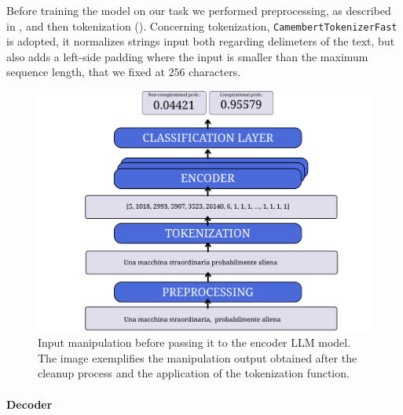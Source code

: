 \documentclass[11pt]{article}
\begin{document}
Before training the model on our task we performed preprocessing, as described in ,
and then tokenization ().
%
Concerning tokenization, \texttt{CamembertTokenizerFast} is adopted,
it normalizes strings input both regarding delimeters of the text,
but also adds a left-side padding where the input is smaller than the maximum sequence length,
that we fixed at $ 256 $ characters.
%
\begin{figure}
  \centering
  \includegraphics[width=\linewidth]{figures/encoder.pdf}
  \caption{
    Input manipulation before passing it to the encoder LLM model.
    The image exemplifies the manipulation output obtained after the cleanup process and the application of the tokenization function.
  }
  \label{fig:preprocessing-and-tokenization-encoder}
\end{figure}

\paragraph{Decoder}
\end{document}
